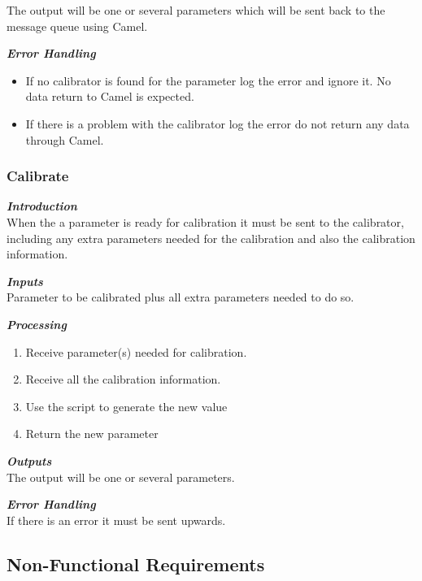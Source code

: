 The output will be one or several parameters which will be sent back to the message queue using Camel.


\textbf{\emph{Error Handling}}\\
\begin{itemize}
\item If no calibrator is found for the parameter log the error and ignore it. No data return to Camel is expected.
\item If there is a problem with the calibrator log the error do not return any data through Camel.
\end{itemize}


\subsubsection{Calibrate}

\textbf{\emph{Introduction}}\\

When the a parameter is ready for calibration it must be sent to the calibrator, including any extra parameters needed for the calibration and also the calibration information.

\textbf{\emph{Inputs}}\\

Parameter to be calibrated plus all extra parameters needed to do so.

\textbf{\emph{Processing}}\\
\begin{enumerate}
\item Receive parameter(s) needed for calibration.
\item Receive all the calibration information.
\item Use the script to generate the new value
\item Return the new parameter
\end{enumerate}

\textbf{\emph{Outputs}}\\

The output will be one or several parameters.


\textbf{\emph{Error Handling}}\\
If there is an error it must be sent upwards.

\pagebreak
\subsection{Non-Functional Requirements}

